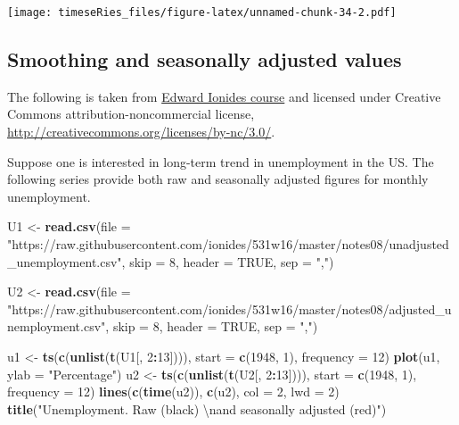 \documentclass[]{book}
\newenvironment{Shaded}{\begin{snugshade}}{\end{snugshade}}
\newcommand{\CharTok}[1]{\textcolor[rgb]{0.31,0.60,0.02}{#1}}
\newcommand{\DataTypeTok}[1]{\textcolor[rgb]{0.13,0.29,0.53}{#1}}
\newcommand{\DecValTok}[1]{\textcolor[rgb]{0.00,0.00,0.81}{#1}}
\newcommand{\KeywordTok}[1]{\textcolor[rgb]{0.13,0.29,0.53}{\textbf{#1}}}
\newcommand{\NormalTok}[1]{#1}
\newcommand{\OperatorTok}[1]{\textcolor[rgb]{0.81,0.36,0.00}{\textbf{#1}}}
\newcommand{\OtherTok}[1]{\textcolor[rgb]{0.56,0.35,0.01}{#1}}
\newcommand{\StringTok}[1]{\textcolor[rgb]{0.31,0.60,0.02}{#1}}
\begin{document}
\texttt{[image: timeseRies\_files/figure-latex/unnamed-chunk-34-2.pdf]}

\hypertarget{smoothing-and-seasonally-adjusted-values}{%
\subsection{Smoothing and seasonally adjusted
values}\label{smoothing-and-seasonally-adjusted-values}}

The following is taken from
\href{http://ionides.github.io/531w16/notes08/notes8.html}{Edward
Ionides course} and licensed under Creative Commons
attribution-noncommercial license,
\url{http://creativecommons.org/licenses/by-nc/3.0/}.

Suppose one is interested in long-term trend in unemployment in the US.
The following series provide both raw and seasonally adjusted figures
for monthly unemployment.

\begin{Shaded}
\begin{Highlighting}[]
\NormalTok{U1 <-}\StringTok{ }\KeywordTok{read.csv}\NormalTok{(}\DataTypeTok{file =} \StringTok{"https://raw.githubusercontent.com/ionides/531w16/master/notes08/unadjusted_unemployment.csv"}\NormalTok{, }
    \DataTypeTok{skip =} \DecValTok{8}\NormalTok{, }\DataTypeTok{header =} \OtherTok{TRUE}\NormalTok{, }\DataTypeTok{sep =} \StringTok{","}\NormalTok{)}

\NormalTok{U2 <-}\StringTok{ }\KeywordTok{read.csv}\NormalTok{(}\DataTypeTok{file =} \StringTok{"https://raw.githubusercontent.com/ionides/531w16/master/notes08/adjusted_unemployment.csv"}\NormalTok{, }
    \DataTypeTok{skip =} \DecValTok{8}\NormalTok{, }\DataTypeTok{header =} \OtherTok{TRUE}\NormalTok{, }\DataTypeTok{sep =} \StringTok{","}\NormalTok{)}

\NormalTok{u1 <-}\StringTok{ }\KeywordTok{ts}\NormalTok{(}\KeywordTok{c}\NormalTok{(}\KeywordTok{unlist}\NormalTok{(}\KeywordTok{t}\NormalTok{(U1[, }\DecValTok{2}\OperatorTok{:}\DecValTok{13}\NormalTok{]))), }\DataTypeTok{start =} \KeywordTok{c}\NormalTok{(}\DecValTok{1948}\NormalTok{, }\DecValTok{1}\NormalTok{), }\DataTypeTok{frequency =} \DecValTok{12}\NormalTok{)}
\KeywordTok{plot}\NormalTok{(u1, }\DataTypeTok{ylab =} \StringTok{"Percentage"}\NormalTok{)}
\NormalTok{u2 <-}\StringTok{ }\KeywordTok{ts}\NormalTok{(}\KeywordTok{c}\NormalTok{(}\KeywordTok{unlist}\NormalTok{(}\KeywordTok{t}\NormalTok{(U2[, }\DecValTok{2}\OperatorTok{:}\DecValTok{13}\NormalTok{]))), }\DataTypeTok{start =} \KeywordTok{c}\NormalTok{(}\DecValTok{1948}\NormalTok{, }\DecValTok{1}\NormalTok{), }\DataTypeTok{frequency =} \DecValTok{12}\NormalTok{)}
\KeywordTok{lines}\NormalTok{(}\KeywordTok{c}\NormalTok{(}\KeywordTok{time}\NormalTok{(u2)), }\KeywordTok{c}\NormalTok{(u2), }\DataTypeTok{col =} \DecValTok{2}\NormalTok{, }\DataTypeTok{lwd =} \DecValTok{2}\NormalTok{)}
\KeywordTok{title}\NormalTok{(}\StringTok{"Unemployment. Raw (black) }\CharTok{\textbackslash{}n}\StringTok{and seasonally adjusted (red)"}\NormalTok{)}
\end{Highlighting}
\end{Shaded}
\end{document}
